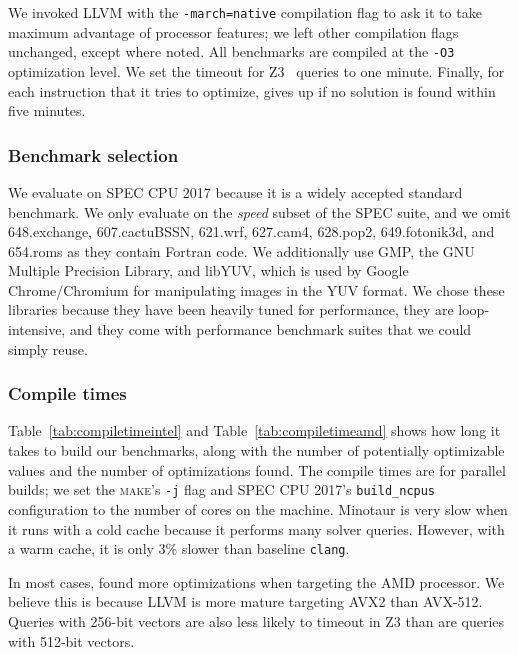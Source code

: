 We invoked LLVM with the \texttt{-march=native} compilation flag to
ask it to take maximum advantage of processor features; we left other
compilation flags unchanged, except where noted.
%
All benchmarks are compiled at the \texttt{-O3} optimization level.
%
We set the timeout for Z3~\cite{z3} queries to one minute.
%
Finally, for each instruction that it tries to optimize, \minotaur{} gives
up if no solution is found within five minutes.


\subsubsection{Benchmark selection}
%
We evaluate on SPEC CPU 2017 because it is a widely accepted standard
benchmark.
%
We only evaluate on the \emph{speed} subset of the SPEC suite, and we
omit 648.exchange, 607.cactuBSSN, 621.wrf, 627.cam4, 628.pop2,
649.fotonik3d, and 654.roms as they contain Fortran code.
%
We additionally use GMP, the GNU Multiple Precision Library, and
libYUV, which is used by Google Chrome/Chromium for manipulating
images in the YUV format.
%
We chose these libraries because they have been heavily tuned for
performance, they are loop-intensive, and they come with performance
benchmark suites that we could simply reuse.


\subsubsection{Compile times}
%
Table~\ref{tab:compiletimeintel} and Table~\ref{tab:compiletimeamd}
shows how long it takes \minotaur{} to build our benchmarks, along
with the number of potentially optimizable values and the number of
optimizations found.
%
The compile times are for parallel builds; we set the \textsc{make}'s
\texttt{-j} flag and SPEC CPU 2017's \texttt{build\_ncpus}
configuration to the number of cores on the machine.
%
Minotaur is very slow when it runs with a cold cache because it
performs many solver queries.
%
However, with a warm cache, it is only 3\% slower than baseline \texttt{clang}.


In most cases, \minotaur{} found more optimizations when targeting the AMD
processor.
%
We believe this is because LLVM is more mature targeting
AVX2 than AVX-512.
%
Queries with 256-bit vectors are also less likely to timeout in Z3 than
are queries with 512-bit vectors.



